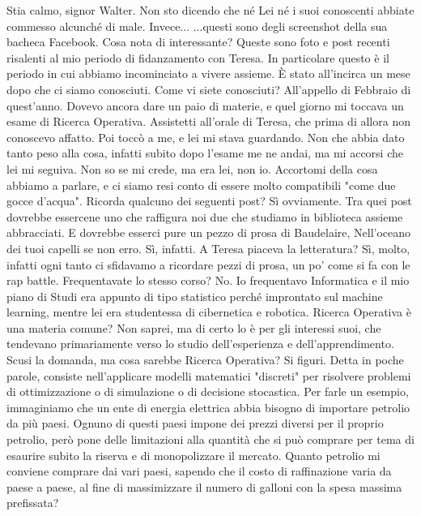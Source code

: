 \documentclass[a4paper,12pt]{article}
\newcommand{\Walter}{\speak{W}}
\newcommand{\Pollazzi}{\speak{P}}
\begin{document}
\begin{dialogue}
\Pollazzi  Stia calmo, signor Walter. Non sto dicendo che né Lei né i suoi
conoscenti abbiate commesso alcunché di male. Invece...  ...questi sono degli screenshot della sua bacheca Facebook. Cosa nota di interessante?
\Walter  Queste sono foto e post recenti risalenti al mio periodo di
fidanzamento con Teresa. In particolare  questo è il periodo in cui abbiamo incominciato a vivere assieme. È stato all'incirca un mese dopo che ci siamo conosciuti.
\Pollazzi  Come vi siete conosciuti?
\Walter  All'appello di Febbraio di quest'anno. Dovevo ancora dare un paio di materie, e quel giorno mi toccava un esame di Ricerca Operativa. Assistetti all'orale di Teresa, che prima di allora non conoscevo affatto. Poi toccò a me, e lei mi stava guardando. Non che abbia dato tanto peso alla cosa, infatti subito dopo l'esame me ne andai, ma mi accorsi che lei mi seguiva. Non so se mi crede, ma era lei, non io. Accortomi della cosa abbiamo a parlare, e ci siamo resi conto di essere molto compatibili "come due gocce d'acqua".
\Pollazzi  {} Ricorda qualcuno dei seguenti post?
\Walter  Sì ovviamente. Tra quei post dovrebbe essercene uno che raffigura noi due che studiamo in biblioteca assieme abbracciati. E dovrebbe esserci pure un pezzo di prosa di Baudelaire, Nell'oceano dei tuoi capelli se non erro.
\Pollazzi  {} Sì, infatti. A Teresa piaceva la letteratura?
\Walter  Sì, molto, infatti ogni tanto ci sfidavamo a ricordare pezzi di prosa, un po' come si fa con le rap battle.
\Pollazzi  Frequentavate lo stesso corso?
\Walter  No. Io frequentavo Informatica e il mio piano di Studi era appunto di tipo statistico perché improntato sul machine learning, mentre lei era studentessa di cibernetica e robotica.
\Pollazzi  Ricerca Operativa è una materia comune?
\Walter  Non saprei, ma di certo lo è per gli interessi suoi, che tendevano primariamente verso lo studio dell'esperienza e dell'apprendimento.
\Pollazzi  Scusi la domanda, ma cosa sarebbe Ricerca Operativa?
\Walter  Si figuri. Detta in poche parole, consiste nell'applicare modelli matematici "discreti" per risolvere problemi di ottimizzazione o di simulazione o di decisione stocastica. Per farle un esempio, immaginiamo che un ente di energia elettrica abbia bisogno di importare petrolio da più paesi. Ognuno di questi paesi impone dei prezzi diversi per il proprio petrolio, però pone delle limitazioni alla quantità che si può comprare per tema di esaurire subito la riserva e di monopolizzare il mercato. Quanto petrolio mi conviene comprare dai vari paesi, sapendo che il costo di raffinazione varia da paese a paese, al fine di massimizzare il numero di galloni con la spesa massima prefissata?

\end{dialogue}
\end{document}
